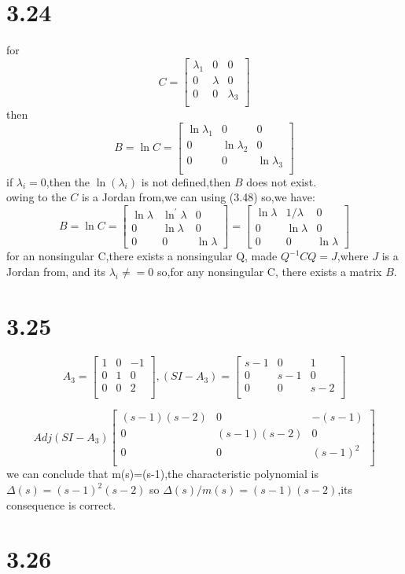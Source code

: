 \documentclass{article}
\begin{document}
\section*{3.24}
for
\[C=
\left[
\begin{array}{ccc}
\lambda_1 & 0 & 0\\
0 & \lambda & 0\\
0 & 0 & \lambda_3\\
\end{array}
\right]
\]
then
\[B=\ln{C}=
\left[
\begin{array}{ccc}
\ln{\lambda_1} & 0 & 0\\
0 & \ln{\lambda_2} & 0\\
0 & 0 & \ln{\lambda_3}\\
\end{array}
\right]
\]
if $\lambda_i=0$,then the $\ln(\lambda_i)$ is not defined,then $B$ does not exist.\\
owing to the $C$ is a Jordan from,we can using (3.48)
so,we have:
\[
B=\ln C=\left[\begin{array}{ccc}
\ln \lambda & \ln ^{\prime} \lambda & 0 \\
0 & \ln \lambda & 0 \\
0 & 0 & \ln \lambda
\end{array}\right]=\left[\begin{array}{ccc}
\ln \lambda & 1 / \lambda & 0 \\
0 & \ln \lambda & 0 \\
0 & 0 & \ln \lambda
\end{array}\right]   
\]
for an nonsingular C,there exists a nonsingular Q,
made $Q^{-1}CQ=J$,where $J$ is a Jordan from, and its $\lambda_i \neq=0$ 
so,for any nonsingular C, there exists a matrix $B$.

\section*{3.25}
\[A_3=
\left[
\begin{array}{ccc}
1 & 0 & -1\\
0 & 1 & 0\\
0 & 0 & 2\\
\end{array}
\right],
(SI-A_3)=
\left[
\begin{array}{ccc}
s-1 & 0 & 1\\
0 & s-1 & 0\\
0 & 0 & s-2\\
\end{array}
\right]
\]

\[
Adj(SI-A_3)  
\left[
\begin{array}{ccc}
(s-1)(s-2) & 0 & -(s-1)\\
0 & (s-1)(s-2) & 0\\
0 & 0 & (s-1)^2\\
\end{array}
\right]
\]
we can conclude that m(s)=(s-1),the characteristic polynomial is$\Delta(s)=(s-1)^2(s-2)$
so $\Delta(s)/m(s)=(s-1)(s-2)$,its consequence is correct.

    
\section*{3.26}
\end{document}
